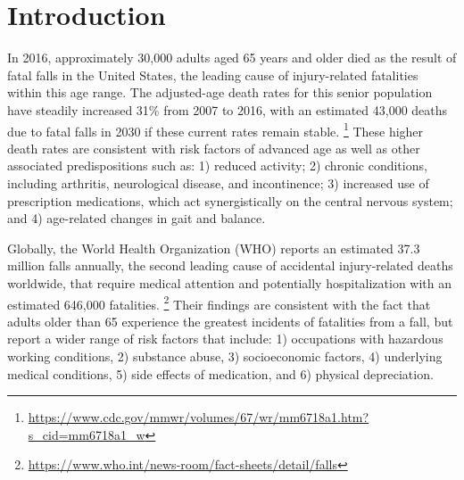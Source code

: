 \documentclass{llncs}
\begin{document}
\section{Introduction}
In 2016, approximately 30,000 adults aged 65 years and older died as the result of fatal falls in the United States, the leading cause of injury-related fatalities within this age range. The adjusted-age death rates for this senior population have steadily increased 31\% from 2007 to 2016, with an estimated 43,000 deaths due to fatal falls in 2030 if these current rates remain stable. \footnote{\url{https://www.cdc.gov/mmwr/volumes/67/wr/mm6718a1.htm?s_cid=mm6718a1_w}} These higher death rates are consistent with risk factors of advanced age as well as other associated predispositions such as: 1) reduced activity; 2) chronic conditions, including arthritis, neurological disease, and incontinence; 3) increased use of prescription medications, which act synergistically on the central nervous system; and 4) age-related changes in gait and balance.


	Globally, the World Health Organization (WHO) reports an estimated 37.3 million falls annually, the second leading cause of accidental injury-related deaths worldwide, that require medical attention and potentially hospitalization with an estimated 646,000 fatalities. \footnote{\url{https://www.who.int/news-room/fact-sheets/detail/falls}} Their findings are consistent with the fact that adults older than 65 experience the greatest incidents of fatalities from a fall, but report a wider range of risk factors that include: 1) occupations with hazardous working conditions, 2) substance abuse, 3) socioeconomic factors, 4) underlying medical conditions, 5) side effects of medication, and 6) physical depreciation. 

\end{document}
